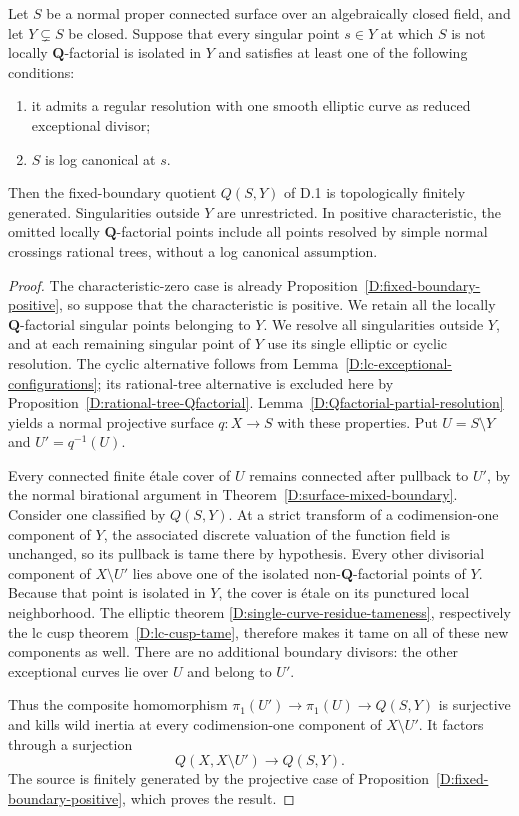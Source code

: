 \begin{corollary}
\label{D:mixed-fixed-boundary}
Let $S$ be a normal proper connected surface over an algebraically
closed field, and let $Y\subsetneq S$ be closed.
Suppose that every singular point $s\in Y$ at which $S$ is not
locally $\mathbf Q$-factorial is isolated in $Y$ and satisfies
at least one of the following conditions:
\begin{enumerate}
\item it admits a regular resolution with one smooth elliptic
curve as reduced exceptional divisor;
\item $S$ is log canonical at $s$.
\end{enumerate}
Then the fixed-boundary quotient $Q(S,Y)$ of D.1 is topologically
finitely generated.  Singularities outside $Y$ are unrestricted.
In positive characteristic, the omitted locally
$\mathbf Q$-factorial points include all points resolved by
simple normal crossings rational trees, without a log canonical
assumption.
\end{corollary}
\begin{proof}
The characteristic-zero case is already
Proposition~\ref{D:fixed-boundary-positive}, so suppose that
the characteristic is positive.  We retain all the locally
$\mathbf Q$-factorial singular points belonging to $Y$.
We resolve all singularities outside $Y$, and at each remaining
singular point of $Y$ use its single elliptic or cyclic resolution.
The cyclic alternative follows from
Lemma~\ref{D:lc-exceptional-configurations}; its rational-tree
alternative is excluded here by
Proposition~\ref{D:rational-tree-Qfactorial}.
Lemma~\ref{D:Qfactorial-partial-resolution} yields a normal
projective surface $q:X\to S$ with these properties.
Put $U=S\setminus Y$ and $U'=q^{-1}(U)$.

Every connected finite \'etale cover of $U$ remains connected
after pullback to $U'$, by the normal birational argument in
Theorem~\ref{D:surface-mixed-boundary}.
Consider one classified by $Q(S,Y)$.
At a strict transform of a codimension-one component of $Y$,
the associated discrete valuation of the function field is
unchanged, so its pullback is tame there by hypothesis.
Every other divisorial component of $X\setminus U'$ lies above
one of the isolated non-$\mathbf Q$-factorial points of $Y$.
Because that point is isolated in $Y$, the cover is \'etale
on its punctured local neighborhood.  The elliptic theorem
\ref{D:single-curve-residue-tameness}, respectively the lc cusp
theorem~\ref{D:lc-cusp-tame}, therefore makes it tame on all of
these new components as well.
There are no additional boundary divisors: the other exceptional
curves lie over $U$ and belong to $U'$.

Thus the composite homomorphism
$\pi_1(U')\to\pi_1(U)\to Q(S,Y)$ is surjective and kills wild
inertia at every codimension-one component of $X\setminus U'$.
It factors through a surjection
\[
             Q(X,X\setminus U')\longrightarrow Q(S,Y).
\]
The source is finitely generated by the projective case of
Proposition~\ref{D:fixed-boundary-positive}, which proves the result.
\end{proof}

